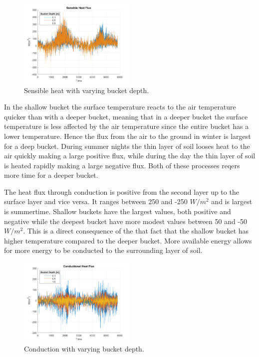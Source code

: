 \documentclass[a4paper,11pt,twocolumn]{article}
\begin{document}
\begin{figure}[h]
	\centering 
	\includegraphics[width=0.5\textwidth]{figures/sensible_heat}
	\caption{Sensible heat with varying bucket depth.}
	\label{fig:sensible}
\end{figure} 

In the shallow bucket the surface temperature reacts to the air temperature quicker than with a deeper bucket, meaning that in a deeper bucket the surface temperature is less affected by the air temperature since the entire bucket has a lower temperature. Hence the flux from the air to the ground in winter is largest for a deep bucket. During summer nights the thin layer of soil looses heat to the air quickly making a large positive flux, while during the day the thin layer of soil is heated rapidly making a large negative flux. Both of these processes reqers more time for a deeper bucket. 

The heat flux through conduction is  positive from the second layer up to the surface layer and vice versa. It ranges between 250 and -250 $W/m^2$ and is largest is summertime. Shallow buckets have the largest values, both positive and negative while the deepest bucket have more modest values between 50 and -50 $W/m^2$. This is a direct consequence of the that fact that the shallow bucket has higher temperature compared to the deeper bucket. More available energy allows for more energy to be conducted to the surrounding layer of soil.

\begin{figure}[h]
	\centering 
	\includegraphics[width=0.5\textwidth]{figures/conduction}
	\caption{Conduction with varying bucket depth.}
	\label{fig:conduction}
\end{figure} 
\end{document}
